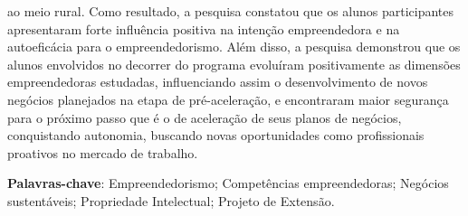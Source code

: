 \begin{resumo}
ao meio rural. Como resultado, a pesquisa constatou que os alunos participantes apresentaram forte influência positiva na intenção empreendedora e na autoeficácia para o empreendedorismo. Além disso, a pesquisa demonstrou que os alunos envolvidos no decorrer do programa evoluíram positivamente as dimensões empreendedoras estudadas, influenciando assim o desenvolvimento de novos negócios planejados na etapa de pré-aceleração, e encontraram maior segurança para o próximo passo que é o de aceleração de seus planos de negócios, conquistando autonomia, buscando novas oportunidades como profissionais proativos no mercado de trabalho.

\textbf{Palavras-chave}: Empreendedorismo; Competências empreendedoras; Negócios sustentáveis; Propriedade Intelectual; Projeto de Extensão.
\end{resumo}